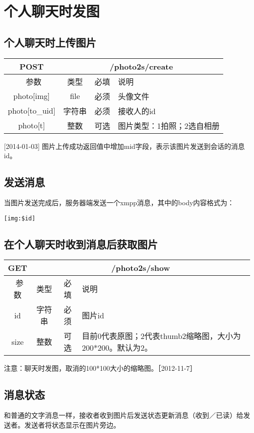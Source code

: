 \section{个人聊天时发图}

\subsection{个人聊天时上传图片}

\begin{table}[H]
   \begin{center}
\begin{tabular}{|c|c|c|p{12cm}|}
\hline
POST & \multicolumn{3}{|c|}{/photo2s/create} \\
\hline\hline
 \  参数  & 类型 & 必填 &  说明  \\
\hline
 photo[img]  & file & 必须 &  头像文件\\
 \hline
 photo[to\_uid]  & 字符串 & 必须 &  接收人的id\\
\hline
  photo[t]  & 整数 & 可选 &  图片类型：1拍照；2选自相册\\
 \hline
\end{tabular}
   \end{center}
\end{table}


[2014-01-03] 图片上传成功返回值中增加mid字段，表示该图片发送到会话的消息id。



\subsection{发送消息}
当图片发送完成后，服务器端发送一个xmpp消息，其中的body内容格式为：

\begin{verbatim}
[img:$id]

\end{verbatim}

\subsection{在个人聊天时收到消息后获取图片}
\begin{table}[H]
   \begin{center}
\begin{tabular}{|c|c|c|p{12cm}|}
\hline
GET & \multicolumn{3}{|c|}{/photo2s/show} \\
\hline\hline
 \  参数  & 类型 & 必填 &  说明  \\
  \hline
 id  & 字符串 & 必须 & 图片id\\
\hline
 size  & 整数 & 可选 &  目前0代表原图；2代表thumb2缩略图，大小为200*200。默认为2。\\ 
\hline
\end{tabular}
   \end{center}
\end{table}

注意：聊天时发图，取消的100*100大小的缩略图。［2012-11-7］


\subsection{消息状态}
和普通的文字消息一样，接收者收到图片后发送状态更新消息（收到／已读）给发送者。发送者将状态显示在图片旁边。

